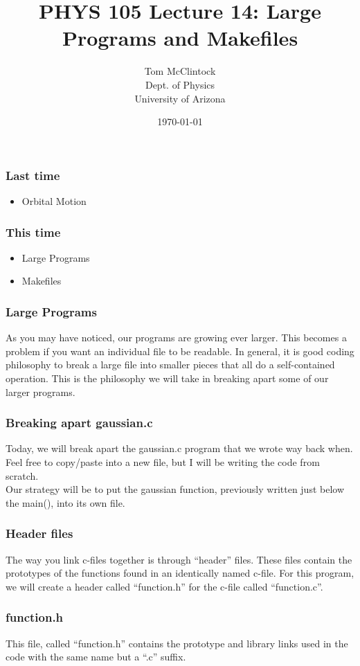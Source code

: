 \documentclass{beamer}
\title{PHYS 105 Lecture 14: Large Programs and Makefiles}
\author{Tom McClintock \\
	Dept. of Physics\\
	University of Arizona
}
\date{\today}
\begin{document}
\begin{frame}
  \titlepage
\end{frame}

\begin{frame}
  \frametitle{Last time}
  \begin{itemize}
    \item Orbital Motion
  \end{itemize}
\end{frame}

\begin{frame}
  \frametitle{This time}
  \begin{itemize}
    \item Large Programs
    \item Makefiles
  \end{itemize}
\end{frame}


\begin{frame}
  \frametitle{Large Programs}
  As you may have noticed, our programs are growing ever larger.
  This becomes a problem if you want an individual file to be readable.
  In general, it is good coding philosophy to break a large file into
  smaller pieces that all do a self-contained operation. This is the
  philosophy we will take in breaking apart some of our larger programs.
\end{frame}

\begin{frame}
  \frametitle{Breaking apart gaussian.c}
  Today, we will break apart the gaussian.c program that we wrote
  way back when. Feel free to copy/paste into a new file, but I will
  be writing the code from scratch.\\
  Our strategy will be to put the gaussian function, previously written
  just below the main(), into its own file.
\end{frame}

\begin{frame}
  \frametitle{Header files}
  The way you link c-files together is through ``header'' files. These
  files contain the prototypes of the functions found in an identically
  named c-file. For this program, we will create a header 
  called ``function.h'' for the c-file called ``function.c''.
\end{frame}

\begin{frame}[fragile]
  \frametitle{function.h}
  This file, called ``function.h'' contains the prototype and library links
  used in the code with the same name but a ``.c'' suffix.
  
\end{frame}
\end{document}
